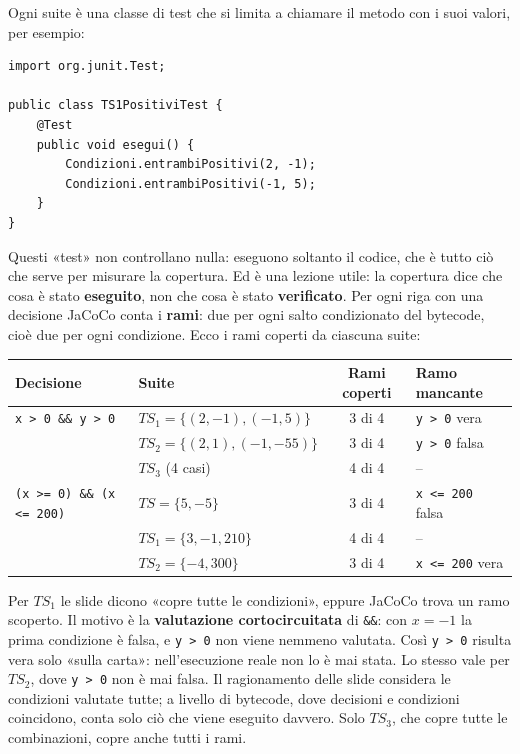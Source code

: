 Ogni suite è una classe di test che si limita a chiamare il metodo con i suoi valori, per esempio:

\begin{lstlisting}[style=java, name=TS1PositiviTest.java]
import org.junit.Test;

public class TS1PositiviTest {
    @Test
    public void esegui() {
        Condizioni.entrambiPositivi(2, -1);
        Condizioni.entrambiPositivi(-1, 5);
    }
}
\end{lstlisting}

Questi «test» non controllano nulla: eseguono soltanto il codice, che è tutto ciò che serve per misurare la copertura.
Ed è una lezione utile: la copertura dice che cosa è stato \textbf{eseguito}, non che cosa è stato \textbf{verificato}.
Per ogni riga con una decisione JaCoCo conta i \textbf{rami}: due per ogni salto condizionato del bytecode, cioè due per
ogni condizione. Ecco i rami coperti da ciascuna suite:

\begin{center}
\renewcommand{\arraystretch}{1.25}
\begin{tabular}{llcl}
  \textbf{Decisione} & \textbf{Suite} & \textbf{Rami coperti} & \textbf{Ramo mancante} \\ \hline
  \texttt{x > 0 \&\& y > 0} & \(TS_1 = \{(2,-1), (-1,5)\}\) & 3 di 4 & \texttt{y > 0} vera \\
  & \(TS_2 = \{(2,1), (-1,-55)\}\) & 3 di 4 & \texttt{y > 0} falsa \\
  & \(TS_3\) (4 casi) & 4 di 4 & -- \\ \hline
  \texttt{(x >= 0) \&\& (x <= 200)} & \(TS = \{5, -5\}\) & 3 di 4 & \texttt{x <= 200} falsa \\
  & \(TS_1 = \{3, -1, 210\}\) & 4 di 4 & -- \\
  & \(TS_2 = \{-4, 300\}\) & 3 di 4 & \texttt{x <= 200} vera \\
\end{tabular}
\end{center}

Per \(TS_1\) le slide dicono «copre tutte le condizioni», eppure JaCoCo trova un ramo scoperto. Il motivo è la
\textbf{valutazione cortocircuitata} di \texttt{\&\&}: con \(x = -1\) la prima condizione è falsa, e \texttt{y > 0} non
viene nemmeno valutata. Così \texttt{y > 0} risulta vera solo «sulla carta»: nell'esecuzione reale non lo è mai stata.
Lo stesso vale per \(TS_2\), dove \texttt{y > 0} non è mai falsa. Il ragionamento delle slide considera le condizioni
valutate tutte; a livello di bytecode, dove decisioni e condizioni coincidono, conta solo ciò che viene eseguito davvero.
Solo \(TS_3\), che copre tutte le combinazioni, copre anche tutti i rami.

